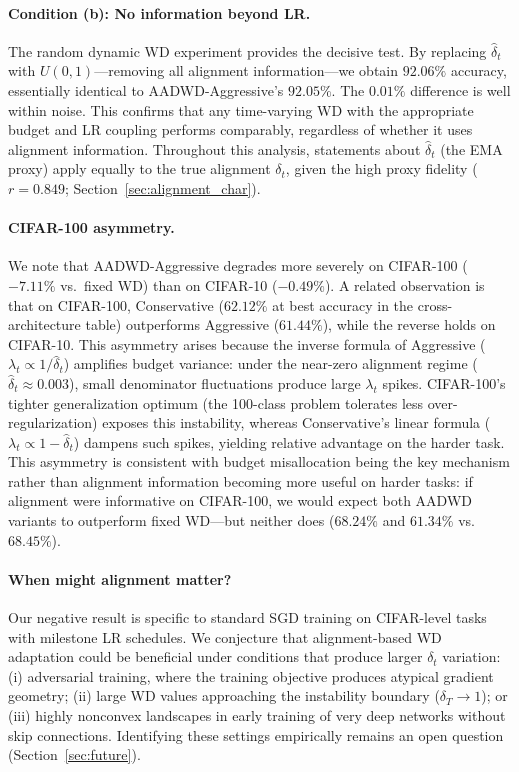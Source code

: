 \documentclass{article}
\begin{document}
\paragraph{Condition (b): No information beyond LR.}
The random dynamic WD experiment provides the decisive test.
By replacing $\hat{\delta}_t$ with $U(0,1)$---removing all alignment
information---we obtain $92.06\%$ accuracy, essentially identical to
AADWD-Aggressive's $92.05\%$.
The $0.01\%$ difference is well within noise.
This confirms that any time-varying WD with the appropriate budget and LR coupling
performs comparably, regardless of whether it uses alignment information.
Throughout this analysis, statements about $\hat{\delta}_t$ (the EMA proxy) apply
equally to the true alignment $\delta_t$, given the high proxy fidelity
($r = 0.849$; Section~\ref{sec:alignment_char}).

\paragraph{CIFAR-100 asymmetry.}
We note that AADWD-Aggressive degrades more severely on CIFAR-100 ($-7.11\%$ vs.\
fixed WD) than on CIFAR-10 ($-0.49\%$).
A related observation is that on CIFAR-100, Conservative ($62.12\%$ at best accuracy
in the cross-architecture table) outperforms Aggressive ($61.44\%$), while the
reverse holds on CIFAR-10.
This asymmetry arises because the inverse formula of Aggressive
($\lambda_t \propto 1/\hat{\delta}_t$) amplifies budget variance: under the
near-zero alignment regime ($\hat{\delta}_t \approx 0.003$), small denominator
fluctuations produce large $\lambda_t$ spikes.
CIFAR-100's tighter generalization optimum (the 100-class problem tolerates less
over-regularization) exposes this instability, whereas Conservative's linear formula
($\lambda_t \propto 1 - \hat{\delta}_t$) dampens such spikes, yielding relative
advantage on the harder task.
This asymmetry is consistent with budget misallocation being the key mechanism
rather than alignment information becoming more useful on harder tasks: if alignment
were informative on CIFAR-100, we would expect both AADWD variants to outperform
fixed WD---but neither does ($68.24\%$ and $61.34\%$ vs.\ $68.45\%$).

\paragraph{When might alignment matter?}
Our negative result is specific to standard SGD training on CIFAR-level tasks with
milestone LR schedules.
We conjecture that alignment-based WD adaptation could be beneficial under conditions
that produce larger $\delta_t$ variation:
(i) adversarial training, where the training objective produces atypical gradient
geometry;
(ii) large WD values approaching the instability boundary ($\delta_T \to 1$); or
(iii) highly nonconvex landscapes in early training of very deep networks without
skip connections.
Identifying these settings empirically remains an open question
(Section~\ref{sec:future}).
\end{document}
